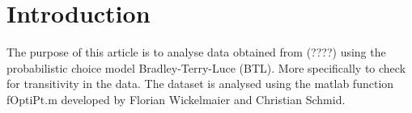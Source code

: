 \section*{Introduction}
\label{Introduktion}

The purpose of this article is to analyse data obtained from (????) using the probabilistic choice model Bradley-Terry-Luce (BTL). More specifically to check for transitivity in the data. The dataset is analysed using the matlab function fOptiPt.m developed by Florian Wickelmaier and Christian Schmid. 
